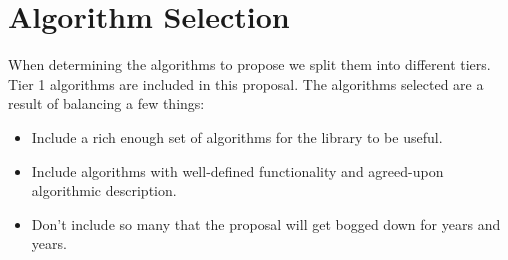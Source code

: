 
\clearpage

\section{Algorithm Selection} \label{other_algo}




When determining the algorithms to propose we split them into different tiers. Tier 1 algorithms are included
in this proposal. The algorithms selected are a result of balancing a few things:
\begin{itemdescr}
\begin{itemize}
      \item Include a rich enough set of algorithms for the library to be useful.
      \item Include algorithms with well-defined functionality and agreed-upon algorithmic description.
      \item Don't include so many that the proposal will get bogged down for years and years.
\end{itemize}
\end{itemdescr}

